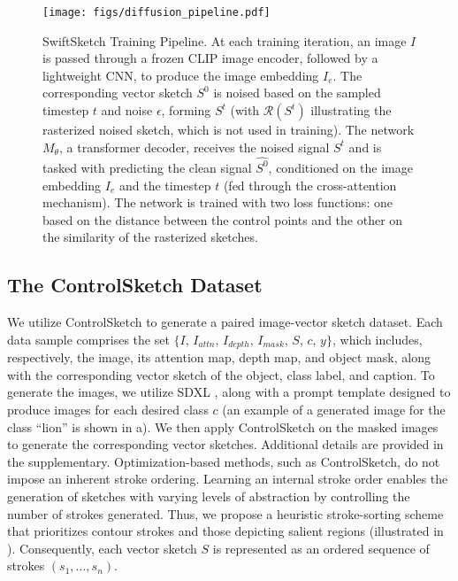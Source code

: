 \begin{figure*}
    \centering
    \texttt{[image: figs/diffusion\_pipeline.pdf]}
    \caption{SwiftSketch Training Pipeline. At each training iteration, an image $I$ is passed through a frozen CLIP image encoder, followed by a lightweight CNN, to produce the image embedding $I_e$. The corresponding vector sketch $S^0$ is noised based on the sampled timestep $t$ and noise $\epsilon$, forming $S^t$ (with $\mathcal{R}(S^t)$ illustrating the rasterized noised sketch, which is not used in training). The network $M_\theta$, a transformer decoder, receives the noised signal  $S^t$ and is tasked with predicting the clean signal $\hat{S^0}$, conditioned on the image embedding $I_e$ and the timestep $t$ (fed through the cross-attention mechanism). The network is trained with two loss functions: one based on the distance between the control points and the other on the similarity of the rasterized sketches.}\vspace{-0.2cm}
    \label{fig:diffusion_pipe}
\end{figure*}

\subsection{The ControlSketch Dataset}
\label{sec:data}
We utilize ControlSketch to generate a paired image-vector sketch dataset. Each data sample comprises the set $\{I$, $I_{attn}$, $I_{depth}$, $I_{mask}$, $S$, $c$, $y\}$, which includes, respectively, the image, its attention map, depth map, and object mask, along with the corresponding vector sketch of the object, class label, and caption. 
To generate the images, we utilize SDXL \cite{podell2023sdxlimprovinglatentdiffusion}, along with a prompt template designed to produce images for each desired class $c$ (an example of a generated image for the class ``lion'' is shown in a).
We then apply ControlSketch on the masked images to generate the corresponding vector sketches. Additional details are provided in the supplementary.
Optimization-based methods, such as ControlSketch, do not impose an inherent stroke ordering. Learning an internal stroke order enables the generation of sketches with varying levels of abstraction by controlling the number of strokes generated.
Thus, we propose a heuristic stroke-sorting scheme that prioritizes contour strokes and those depicting salient regions (illustrated in ). Consequently, each vector sketch $S$ is represented as an ordered sequence of strokes $(s_1, \dots, s_n)$.



